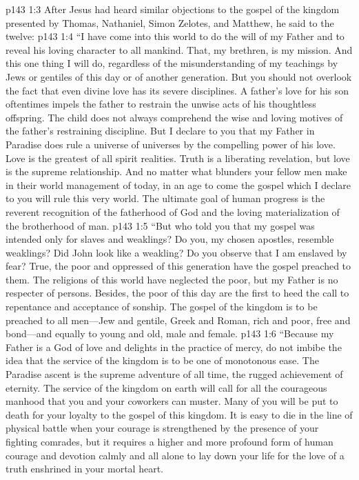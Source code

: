 \vs p143 1:3 After Jesus had heard similar objections to the gospel of the kingdom presented by Thomas, Nathaniel, Simon Zelotes, and Matthew, he said to the twelve:
\vs p143 1:4 \textcolor{ubdarkred}{“I have come into this world to do the will of my Father and to reveal his loving character to all mankind. That, my brethren, is my mission. And this one thing I will do, regardless of the misunderstanding of my teachings by Jews or gentiles of this day or of another generation. But you should not overlook the fact that even divine love has its severe disciplines. A father’s love for his son oftentimes impels the father to restrain the unwise acts of his thoughtless offspring. The child does not always comprehend the wise and loving motives of the father’s restraining discipline. But I declare to you that my Father in Paradise does rule a universe of universes by the compelling power of his love. Love is the greatest of all spirit realities. Truth is a liberating revelation, but love is the supreme relationship. And no matter what blunders your fellow men make in their world management of today, in an age to come the gospel which I declare to you will rule this very world. The ultimate goal of human progress is the reverent recognition of the fatherhood of God and the loving materialization of the brotherhood of man.}
\vs p143 1:5 \textcolor{ubdarkred}{“But who told you that my gospel was intended only for slaves and weaklings? Do you, my chosen apostles, resemble weaklings? Did John look like a weakling? Do you observe that I am enslaved by fear? True, the poor and oppressed of this generation have the gospel preached to them. The religions of this world have neglected the poor, but my Father is no respecter of persons. Besides, the poor of this day are the first to heed the call to repentance and acceptance of sonship. The gospel of the kingdom is to be preached to all men---Jew and gentile, Greek and Roman, rich and poor, free and bond---and equally to young and old, male and female.}
\vs p143 1:6 \textcolor{ubdarkred}{“Because my Father is a God of love and delights in the practice of mercy, do not imbibe the idea that the service of the kingdom is to be one of monotonous ease. The Paradise ascent is the supreme adventure of all time, the rugged achievement of eternity. The service of the kingdom on earth will call for all the courageous manhood that you and your coworkers can muster. Many of you will be put to death for your loyalty to the gospel of this kingdom. It is easy to die in the line of physical battle when your courage is strengthened by the presence of your fighting comrades, but it requires a higher and more profound form of human courage and devotion calmly and all alone to lay down your life for the love of a truth enshrined in your mortal heart.}
